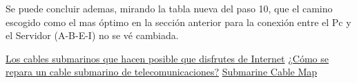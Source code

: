 \documentclass{article}
\begin{document}
Se puede concluir ademas, mirando la tabla nueva del paso 10, que el camino escogido como el mas óptimo en la sección anterior para la conexión entre el Pc y el Servidor (A-B-E-I) no se vé cambiada.


\begin{thebibliography}{1}
 \href{http://www.trenditup.com/trenditup/tecnologia/los-cables-submarinos-que-hacen-posible-que-disfrutes-de-internet/}{Los cables submarinos que hacen posible que disfrutes de Internet}
 \href{http://blogthinkbig.com/reparacion-cable-submarino/}{¿Cómo se repara un cable submarino de telecomunicaciones?}
 \href{http://www.submarinecablemap.com/#/country/chile}{Submarine Cable Map}

\end{thebibliography}
\end{document}
